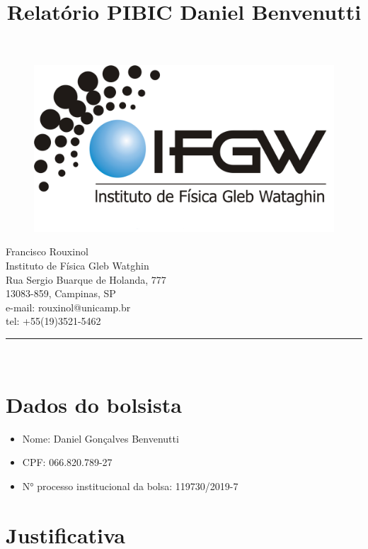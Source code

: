 \documentclass[12pt,a4paper]{article}
\title{Relatório PIBIC Daniel Benvenutti}
\makeatletter
\def\vhrulefill#1{\leavevmode\leaders\hrule\@height#1\hfill \kern\z@}
\makeatother
\begin{document}
\begin{figure}
\includegraphics[scale=0.111]{logo-documentos.png}
\end{figure}



\noindent 
\begin{flushright}
\begin{scriptsize}
Francisco Rouxinol \\
Instituto de Física Gleb Watghin\\
Rua Sergio Buarque de Holanda, 777\\
13083-859, Campinas, SP \\
e-mail: rouxinol@unicamp.br\\
tel: +55(19)3521-5462\\
\vhrulefill{1pt} \\ %
\end{scriptsize}
\end{flushright}


\section{Dados do bolsista}
\begin{itemize}
    \item Nome: Daniel Gonçalves Benvenutti
    \item CPF: 066.820.789-27
    \item N° processo institucional da bolsa: 119730/2019-7
\end{itemize}
\section{Justificativa}



\end{document}
